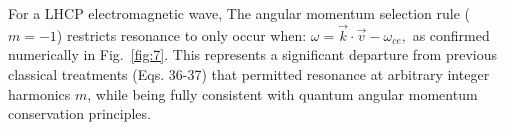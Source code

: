 \documentclass{cpbtex3}
\begin{document}
%
%
For a LHCP electromagnetic wave, The angular momentum selection rule ($m = -1$) restricts resonance to only occur when:
\(
    \omega = \vec{k} \cdot \vec{v} - \omega_{ce},
\)
as confirmed numerically in Fig.~\ref{fig:7}. This represents a significant departure from previous classical treatments \cite{dendy1987classical} (Eqs. 36-37) that permitted resonance at arbitrary integer harmonics $m$, while being fully consistent with quantum angular momentum conservation principles.
\end{document}
